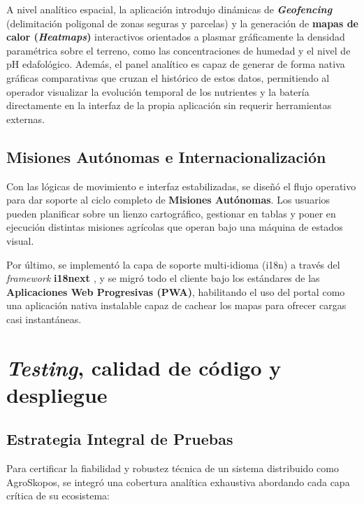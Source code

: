 A nivel analítico espacial, la aplicación introdujo dinámicas de \textbf{\textit{Geofencing}} (delimitación poligonal de zonas seguras y parcelas) y la generación de \textbf{mapas de calor (\textit{Heatmaps})} interactivos orientados a plasmar gráficamente la densidad paramétrica sobre el terreno, como las concentraciones de humedad y el nivel de pH edafológico. Además, el panel analítico es capaz de generar de forma nativa gráficas comparativas que cruzan el histórico de estos datos, permitiendo al operador visualizar la evolución temporal de los nutrientes y la batería directamente en la interfaz de la propia aplicación sin requerir herramientas externas.


\subsection{Misiones Autónomas e Internacionalización}
Con las lógicas de movimiento e interfaz estabilizadas, se diseñó el flujo operativo para dar soporte al ciclo completo de \textbf{Misiones Autónomas}. Los usuarios pueden planificar sobre un lienzo cartográfico, gestionar en tablas y poner en ejecución distintas misiones agrícolas que operan bajo una máquina de estados visual.


Por último, se implementó la capa de soporte multi-idioma (i18n) a través del \textit{framework} \textbf{i18next \cite{i18next}}, y se migró todo el cliente bajo los estándares de las \textbf{Aplicaciones Web Progresivas (PWA)}, habilitando el uso del portal como una aplicación nativa instalable capaz de cachear los mapas para ofrecer cargas casi instantáneas.

\section{\textit{Testing}, calidad de código y despliegue}

\subsection{Estrategia Integral de Pruebas}
Para certificar la fiabilidad y robustez técnica de un sistema distribuido como AgroSkopos, se integró una cobertura analítica exhaustiva abordando cada capa crítica de su ecosistema:

